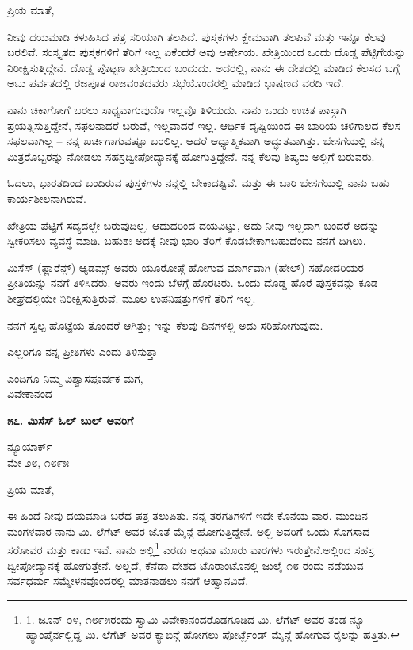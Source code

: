 ಪ್ರಿಯ ಮಾತೆ,

ನೀವು ದಯಮಾಡಿ ಕಳುಹಿಸಿದ ಪತ್ರ ಸರಿಯಾಗಿ ತಲಪಿದೆ. ಪುಸ್ತಕಗಳು ಕ್ಷೇಮವಾಗಿ ತಲಪಿವೆ ಮತ್ತು ಇನ್ನೂ ಕೆಲವು ಬರಲಿವೆ. ಸಂಸ್ಕೃತದ ಪುಸ್ತಕಗಳಿಗೆ ತೆರಿಗೆ ಇಲ್ಲ ಏಕೆಂದರೆ ಅವು ಆರ್ಷೇಯ. ಖೇತ್ರಿಯಿಂದ ಒಂದು ದೊಡ್ಡ ಪೆಟ್ಟಿಗೆಯನ್ನು ನಿರೀಕ್ಷಿಸುತ್ತಿದ್ದೇನೆ. ದೊಡ್ಡ ಪೊಟ್ಟಣ ಖೇತ್ರಿಯಿಂದ ಬಂದುದು. ಅದರಲ್ಲಿ, ನಾನು ಈ ದೇಶದಲ್ಲಿ ಮಾಡಿದ ಕೆಲಸದ ಬಗ್ಗೆ ಅಬು ಪರ್ವತದಲ್ಲಿ ರಜಪೂತ ರಾಜವಂಶದವರು ಸಭೆಯೊಂದರಲ್ಲಿ ಮಾಡಿದ ಭಾಷಣದ ವರದಿ ಇದೆ.

ನಾನು ಚಿಕಾಗೋಗೆ ಬರಲು ಸಾಧ್ಯವಾಗುವುದೊ ಇಲ್ಲವೊ ತಿಳಿಯದು. ನಾನು ಒಂದು ಉಚಿತ ಪಾಸ್ಗಾಗಿ ಪ್ರಯತ್ನಿಸುತ್ತಿದ್ದೇನೆ, ಸಫಲನಾದರೆ ಬರುವೆ, ಇಲ್ಲವಾದರೆ ಇಲ್ಲ. ಆರ್ಥಿಕ ದೃಷ್ಟಿಯಿಂದ ಈ ಬಾರಿಯ ಚಳಿಗಾಲದ ಕೆಲಸ ಸಫಲವಾಗಿಲ್ಲ – ನನ್ನ ಖರ್ಚಿಗಾಗುವಷ್ಟೂ ಬರಲಿಲ್ಲ. ಆದರೆ ಆಧ್ಯಾತ್ಮಿಕವಾಗಿ ಅದ್ಭುತವಾಗಿತ್ತು. ಬೇಸಗೆಯಲ್ಲಿ ನನ್ನ ಮಿತ್ರರೊಬ್ಬರನ್ನು ನೋಡಲು ಸಹಸ್ರದ್ವೀಪೋದ್ಯಾನಕ್ಕೆ ಹೋಗುತ್ತಿದ್ದೇನೆ. ನನ್ನ ಕೆಲವು ಶಿಷ್ಯರು ಅಲ್ಲಿಗೆ ಬರುವರು.

ಓದಲು, ಭಾರತದಿಂದ ಬಂದಿರುವ ಪುಸ್ತಕಗಳು ನನ್ನಲ್ಲಿ ಬೇಕಾದಷ್ಟಿವೆ. ಮತ್ತು ಈ ಬಾರಿ ಬೇಸಗೆಯಲ್ಲಿ ನಾನು ಬಹು ಕಾರ್ಯಶೀಲನಾಗಿರುವೆ.

ಖೇತ್ರಿಯ ಪೆಟ್ಟಿಗೆ ಸದ್ಯದಲ್ಲೇ ಬರುವುದಿಲ್ಲ. ಆದುದರಿಂದ ದಯವಿಟ್ಟು, ಅದು ನೀವು ಇಲ್ಲದಾಗ ಬಂದರೆ ಅದನ್ನು ಸ್ವೀಕರಿಸಲು ವ್ಯವಸ್ಥೆ ಮಾಡಿ. ಬಹುಶಃ ಅದಕ್ಕೆ ನೀವು ಭಾರಿ ತೆರಿಗೆ ಕೊಡಬೇಕಾಗಬಹುದೆಂದು ನನಗೆ ದಿಗಿಲು.

ಮಿಸೆಸ್ (ಫ್ಲಾರೆನ್ಸ್) ಆ್ಯಡಮ್ಸ್ ಅವರು ಯೂರೋಪ್ಗೆ ಹೋಗುವ ಮಾರ್ಗವಾಗಿ (ಹೇಲ್) ಸಹೋದರಿಯರ ಪ್ರೀತಿಯನ್ನು ನನಗೆ ತಿಳಿಸಿದರು. ಅವರು ಇಂದು ಬೆಳಗ್ಗೆ ಹೊರಟರು. ಒಂದು ದೊಡ್ಡ ಹೊರೆ ಪುಸ್ತಕವನ್ನು ಕೂಡ ಶೀಘ್ರದಲ್ಲಿಯೇ ನಿರೀಕ್ಷಿಸುತ್ತಿರುವೆ. ಮೂಲ ಉಪನಿಷತ್ತುಗಳಿಗೆ ತೆರಿಗೆ ಇಲ್ಲ.

ನನಗೆ ಸ್ವಲ್ಪ ಹೊಟ್ಟೆಯ ತೊಂದರೆ ಆಗಿತ್ತು; ಇನ್ನು ಕೆಲವು ದಿನಗಳಲ್ಲಿ ಅದು ಸರಿಹೋಗುವುದು.

ಎಲ್ಲರಿಗೂ ನನ್ನ ಪ್ರೀತಿಗಳು ಎಂದು ತಿಳಿಸುತ್ತಾ

\begin{flushright}
ಎಂದಿಗೂ ನಿಮ್ಮ ವಿಶ್ವಾಸಪೂರ್ವಕ ಮಗ,\\ವಿವೇಕಾನಂದ
\end{flushright}

\begin{center}
\textbf{೫೭. ಮಿಸೆಸ್ ಓಲ್ ಬುಲ್ ಅವರಿಗೆ}
\end{center}

\begin{flushright}
ನ್ಯೂಯಾರ್ಕ್\\ಮೇ ೨೮, ೧೮೯೫
\end{flushright}

ಪ್ರಿಯ ಮಾತೆ,

ಈ ಹಿಂದೆ ನೀವು ದಯಮಾಡಿ ಬರೆದ ಪತ್ರ ತಲುಪಿತು. ನನ್ನ ತರಗತಿಗಳಿಗೆ ಇದೇ ಕೊನೆಯ ವಾರ. ಮುಂದಿನ ಮಂಗಳವಾರ ನಾನು ಮಿ. ಲೆಗೆಟ್ ಅವರ ಜೊತೆ ಮೈನ್ಗೆ ಹೋಗುತ್ತಿದ್ದೇನೆ. ಅಲ್ಲಿ ಅವರಿಗೆ ಒಂದು ಸೊಗಸಾದ ಸರೋವರ ಮತ್ತು ಕಾಡು ಇವೆ. ನಾನು ಅಲ್ಲಿ\footnote{1. ಜೂನ್ ೦೪, ೧೮೯೫ರಂದು ಸ್ವಾಮಿ ವಿವೇಕಾನಂದರೊಡಗೂಡಿದ ಮಿ. ಲೆಗೆಟ್ ಅವರ ತಂಡ ನ್ಯೂ ಹ್ಯಾಂಪೈರ್ನಲ್ಲಿದ್ದ ಮಿ. ಲೆಗೆಟ್ ಅವರ ಕ್ಯಾಬಿನ್ಗೆ ಹೋಗಲು ಪೋರ್ಟ್ಲೆಂಡ್ ಮೈನ್ಗೆ ಹೋಗುವ ರೈಲನ್ನು ಹತ್ತಿತು.} ಎರಡು ಅಥವಾ ಮೂರು ವಾರಗಳು ಇರುತ್ತೇನೆ.ಅಲ್ಲಿಂದ ಸಹಸ್ರ ದ್ವೀಪೋದ್ಯಾನಕ್ಕೆ ಹೋಗುತ್ತೇನೆ. ಅಲ್ಲದೆ, ಕೆನೆಡಾ ದೇಶದ ಟೊರಾಂಟೊನಲ್ಲಿ ಜುಲೈ ೧೮ ರಂದು ನಡೆಯುವ ಸರ್ವಧರ್ಮ ಸಮ್ಮೇಳನವೊಂದರಲ್ಲಿ ಮಾತನಾಡಲು ನನಗೆ ಆಹ್ವಾನವಿದೆ.


